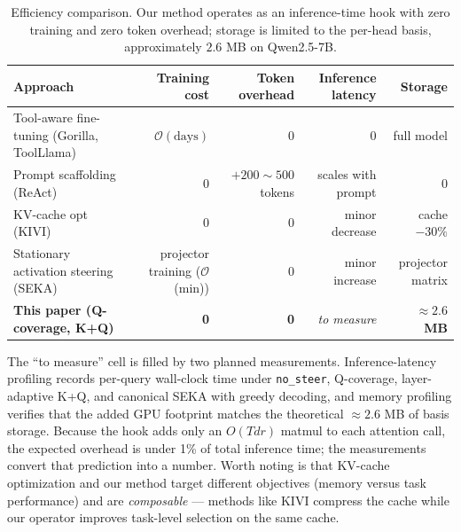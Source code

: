 \begin{table}[t]
\centering
\caption{Efficiency comparison. Our method operates as an inference-time hook with zero training and zero token overhead; storage is limited to the per-head basis, approximately $2.6$ MB on Qwen2.5-7B.}
\label{tab:e-efficiency}
\small
\begin{tabularx}{\linewidth}{@{}Xrrrr@{}}
\toprule
Approach & Training cost & Token overhead & Inference latency & Storage \\
\midrule
Tool-aware fine-tuning (Gorilla, ToolLlama) & $\mathcal{O}(\text{days})$ & 0 & 0 & full model \\
Prompt scaffolding (ReAct) & 0 & $+200\sim 500$ tokens & scales with prompt & 0 \\
KV-cache opt (KIVI) & 0 & 0 & minor decrease & cache $-30\%$ \\
Stationary activation steering (SEKA) & projector training ($\mathcal{O}$(min)) & 0 & minor increase & projector matrix \\
\textbf{This paper (Q-coverage, K+Q)} & \textbf{0} & \textbf{0} & \emph{to measure} & $\boldsymbol{\approx 2.6}$ \textbf{MB} \\
\bottomrule
\end{tabularx}
\end{table}

The ``to measure'' cell is filled by two planned measurements. Inference-latency profiling records per-query wall-clock time under \texttt{no\_steer}, Q-coverage, layer-adaptive K+Q, and canonical SEKA with greedy decoding, and memory profiling verifies that the added GPU footprint matches the theoretical $\approx 2.6$ MB of basis storage. Because the hook adds only an $O(Tdr)$ matmul to each attention call, the expected overhead is under 1\% of total inference time; the measurements convert that prediction into a number. Worth noting is that KV-cache optimization and our method target different objectives (memory versus task performance) and are \emph{composable} --- methods like KIVI compress the cache while our operator improves task-level selection on the same cache.

